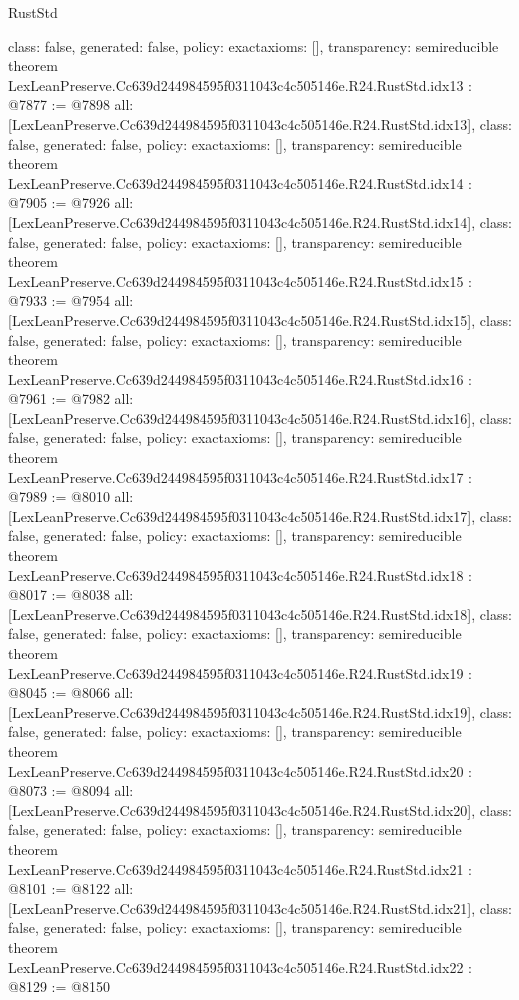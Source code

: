 \begin{lexlean}{RustStd}
\begin{coremodule}
{  class: false,
  generated: false,
  policy: exact{axioms: []},
  transparency: semireducible
}
theorem LexLeanPreserve.Cc639d244984595f0311043c4c505146e.R24.RustStd.idx13 : @7877 := @7898 {
  all: [LexLeanPreserve.Cc639d244984595f0311043c4c505146e.R24.RustStd.idx13],
  class: false,
  generated: false,
  policy: exact{axioms: []},
  transparency: semireducible
}
theorem LexLeanPreserve.Cc639d244984595f0311043c4c505146e.R24.RustStd.idx14 : @7905 := @7926 {
  all: [LexLeanPreserve.Cc639d244984595f0311043c4c505146e.R24.RustStd.idx14],
  class: false,
  generated: false,
  policy: exact{axioms: []},
  transparency: semireducible
}
theorem LexLeanPreserve.Cc639d244984595f0311043c4c505146e.R24.RustStd.idx15 : @7933 := @7954 {
  all: [LexLeanPreserve.Cc639d244984595f0311043c4c505146e.R24.RustStd.idx15],
  class: false,
  generated: false,
  policy: exact{axioms: []},
  transparency: semireducible
}
theorem LexLeanPreserve.Cc639d244984595f0311043c4c505146e.R24.RustStd.idx16 : @7961 := @7982 {
  all: [LexLeanPreserve.Cc639d244984595f0311043c4c505146e.R24.RustStd.idx16],
  class: false,
  generated: false,
  policy: exact{axioms: []},
  transparency: semireducible
}
theorem LexLeanPreserve.Cc639d244984595f0311043c4c505146e.R24.RustStd.idx17 : @7989 := @8010 {
  all: [LexLeanPreserve.Cc639d244984595f0311043c4c505146e.R24.RustStd.idx17],
  class: false,
  generated: false,
  policy: exact{axioms: []},
  transparency: semireducible
}
theorem LexLeanPreserve.Cc639d244984595f0311043c4c505146e.R24.RustStd.idx18 : @8017 := @8038 {
  all: [LexLeanPreserve.Cc639d244984595f0311043c4c505146e.R24.RustStd.idx18],
  class: false,
  generated: false,
  policy: exact{axioms: []},
  transparency: semireducible
}
theorem LexLeanPreserve.Cc639d244984595f0311043c4c505146e.R24.RustStd.idx19 : @8045 := @8066 {
  all: [LexLeanPreserve.Cc639d244984595f0311043c4c505146e.R24.RustStd.idx19],
  class: false,
  generated: false,
  policy: exact{axioms: []},
  transparency: semireducible
}
theorem LexLeanPreserve.Cc639d244984595f0311043c4c505146e.R24.RustStd.idx20 : @8073 := @8094 {
  all: [LexLeanPreserve.Cc639d244984595f0311043c4c505146e.R24.RustStd.idx20],
  class: false,
  generated: false,
  policy: exact{axioms: []},
  transparency: semireducible
}
theorem LexLeanPreserve.Cc639d244984595f0311043c4c505146e.R24.RustStd.idx21 : @8101 := @8122 {
  all: [LexLeanPreserve.Cc639d244984595f0311043c4c505146e.R24.RustStd.idx21],
  class: false,
  generated: false,
  policy: exact{axioms: []},
  transparency: semireducible
}
theorem LexLeanPreserve.Cc639d244984595f0311043c4c505146e.R24.RustStd.idx22 : @8129 := @8150 {
}
\end{coremodule}
\end{lexlean}

